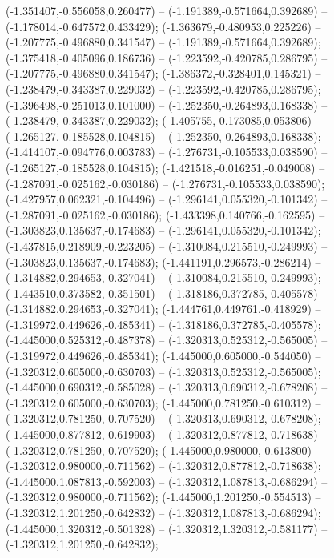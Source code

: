  (-1.351407,-0.556058,0.260477) -- (-1.191389,-0.571664,0.392689) -- (-1.178014,-0.647572,0.433429);
 (-1.363679,-0.480953,0.225226) -- (-1.207775,-0.496880,0.341547) -- (-1.191389,-0.571664,0.392689);
 (-1.375418,-0.405096,0.186736) -- (-1.223592,-0.420785,0.286795) -- (-1.207775,-0.496880,0.341547);
 (-1.386372,-0.328401,0.145321) -- (-1.238479,-0.343387,0.229032) -- (-1.223592,-0.420785,0.286795);
 (-1.396498,-0.251013,0.101000) -- (-1.252350,-0.264893,0.168338) -- (-1.238479,-0.343387,0.229032);
 (-1.405755,-0.173085,0.053806) -- (-1.265127,-0.185528,0.104815) -- (-1.252350,-0.264893,0.168338);
 (-1.414107,-0.094776,0.003783) -- (-1.276731,-0.105533,0.038590) -- (-1.265127,-0.185528,0.104815);
 (-1.421518,-0.016251,-0.049008) -- (-1.287091,-0.025162,-0.030186) -- (-1.276731,-0.105533,0.038590);
 (-1.427957,0.062321,-0.104496) -- (-1.296141,0.055320,-0.101342) -- (-1.287091,-0.025162,-0.030186);
 (-1.433398,0.140766,-0.162595) -- (-1.303823,0.135637,-0.174683) -- (-1.296141,0.055320,-0.101342);
 (-1.437815,0.218909,-0.223205) -- (-1.310084,0.215510,-0.249993) -- (-1.303823,0.135637,-0.174683);
 (-1.441191,0.296573,-0.286214) -- (-1.314882,0.294653,-0.327041) -- (-1.310084,0.215510,-0.249993);
 (-1.443510,0.373582,-0.351501) -- (-1.318186,0.372785,-0.405578) -- (-1.314882,0.294653,-0.327041);
 (-1.444761,0.449761,-0.418929) -- (-1.319972,0.449626,-0.485341) -- (-1.318186,0.372785,-0.405578);
 (-1.445000,0.525312,-0.487378) -- (-1.320313,0.525312,-0.565005) -- (-1.319972,0.449626,-0.485341);
 (-1.445000,0.605000,-0.544050) -- (-1.320312,0.605000,-0.630703) -- (-1.320313,0.525312,-0.565005);
 (-1.445000,0.690312,-0.585028) -- (-1.320313,0.690312,-0.678208) -- (-1.320312,0.605000,-0.630703);
 (-1.445000,0.781250,-0.610312) -- (-1.320312,0.781250,-0.707520) -- (-1.320313,0.690312,-0.678208);
 (-1.445000,0.877812,-0.619903) -- (-1.320312,0.877812,-0.718638) -- (-1.320312,0.781250,-0.707520);
 (-1.445000,0.980000,-0.613800) -- (-1.320312,0.980000,-0.711562) -- (-1.320312,0.877812,-0.718638);
 (-1.445000,1.087813,-0.592003) -- (-1.320312,1.087813,-0.686294) -- (-1.320312,0.980000,-0.711562);
 (-1.445000,1.201250,-0.554513) -- (-1.320312,1.201250,-0.642832) -- (-1.320312,1.087813,-0.686294);
 (-1.445000,1.320312,-0.501328) -- (-1.320312,1.320312,-0.581177) -- (-1.320312,1.201250,-0.642832);
